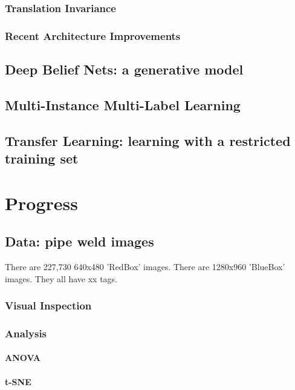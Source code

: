 \documentclass[a4paper,11pt]{article}
\begin{document}
\subsubsection{Translation Invariance}

\subsubsection{Recent Architecture Improvements}

\pagebreak
\subsection{Deep Belief Nets: a generative model}


\subsection{Multi-Instance Multi-Label Learning}

\subsection{Transfer Learning: learning with a restricted training set}



\clearpage
\section{Progress}

\subsection{Data: pipe weld images}
There are 227,730 640x480 'RedBox' images. There are 1280x960 'BlueBox' images. They all have xx tags.

\subsubsection{Visual Inspection}
\subsubsection{Analysis}
\paragraph{ANOVA}
\paragraph{t-SNE}
\end{document}
